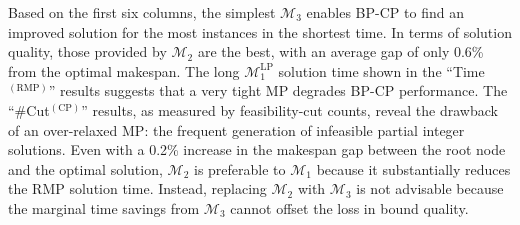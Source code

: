 \documentclass[12pt]{article}
\begin{document}

Based on the first six columns, the simplest $\mathcal{M}_3$ enables BP-CP to find an improved solution for the most instances in the shortest time. In terms of solution quality, those provided by $\mathcal{M}_2$ are the best, with an average gap of only 0.6\% from the optimal makespan. The long $\mathcal{M}^{\text{LP}}_1$ solution time shown in the ``Time$^{(\text{RMP})}$'' results suggests that a very tight MP degrades BP-CP performance. The ``\#Cut$^{(\text{CP})}$'' results, as measured by feasibility-cut counts, reveal the drawback of an over-relaxed MP: the frequent generation of infeasible partial integer solutions. Even with a 0.2\% increase in the makespan gap between the root node and the optimal solution, $\mathcal{M}_2$ is preferable to $\mathcal{M}_1$ %
because it substantially reduces the RMP solution time. Instead, replacing $\mathcal{M}_2$ with $\mathcal{M}_3$ is not advisable because the marginal time savings from $\mathcal{M}_3$ cannot offset the loss in bound quality.
\end{document}
